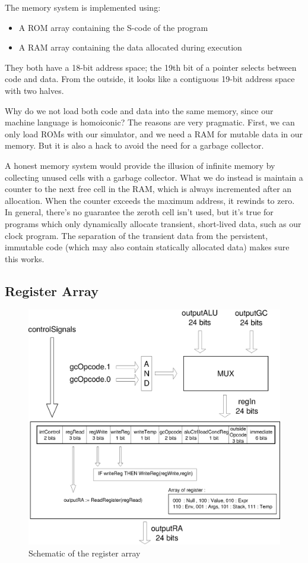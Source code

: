 \documentclass[a4paper, 11pt]{article}
\begin{document}
The memory system is implemented using:
\begin{itemize}
\item A ROM array containing the S-code of the program
\item A RAM array containing the data allocated during execution
\end{itemize}
They both have a 18-bit address space; the 19th bit of a pointer selects between code and data. From the outside, it looks like a contiguous 19-bit address space with two halves.

Why do we not load both code and data into the same memory, since our machine language is homoiconic? The reasons are very pragmatic. First, we can only load ROMs with our simulator, and we need a RAM for mutable data in our memory. But it is also a hack to avoid the need for a garbage collector.

A honest memory system would provide the illusion of infinite memory by collecting unused cells with a garbage collector. What we do instead is maintain a counter to the next free cell in the RAM, which is always incremented after an allocation. When the counter exceeds the maximum address, it rewinds to zero. In general, there's no guarantee the zeroth cell isn't used, but it's true for programs which only dynamically allocate transient, short-lived data, such as our clock program. The separation of the transient data from the persistent, immutable code (which may also contain statically allocated data) makes sure this works.



\newpage
\subsection{Register Array}
\begin{figure}[h]
\center
\caption{Schematic of the register array}
   \includegraphics[scale=0.5]{RA.eps}
\end{figure}
\end{document}
